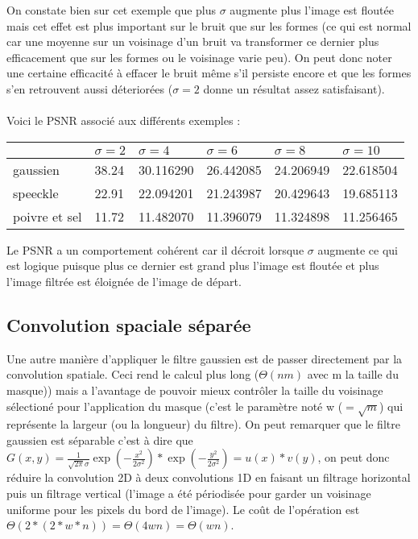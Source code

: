 \documentclass[12pt]{article}
\numberwithin{equation}{section}
\begin{document}
On constate bien sur cet exemple que plus $\sigma$ augmente plus l'image est floutée mais cet effet est plus important sur le bruit que sur les formes (ce qui est normal car une moyenne sur un voisinage d'un bruit va transformer ce dernier plus efficacement que sur les formes ou le voisinage varie peu). On peut donc noter une certaine efficacité à effacer le bruit même s'il persiste encore et que les formes s'en retrouvent aussi déteriorées ($\sigma = 2$ donne un résultat assez satisfaisant).
\\\\
Voici le PSNR associé aux différents exemples :\\
\begin{center}
  \begin{tabular}{|l|l|l|l|l|l|}
    \hline
    & $\sigma = 2$ & $\sigma = 4$ & $\sigma = 6$  & $\sigma = 8$ & $\sigma = 10$ \\
    \hline
    gaussien & 38.24 & 30.116290 & 26.442085 & 24.206949 & 22.618504\\
    \hline
    speeckle & 22.91 & 22.094201  & 21.243987 & 20.429643 & 19.685113\\
    \hline
    poivre et sel & 11.72 & 11.482070 & 11.396079 & 11.324898 & 11.256465\\
    \hline
  \end{tabular}
\end{center}
Le PSNR a un comportement cohérent car il décroit lorsque $\sigma$ augmente ce qui est logique puisque plus ce dernier est grand plus l'image est floutée et plus l'image filtrée est éloignée de l'image de départ.
\subsection{Convolution spaciale séparée}
Une autre manière d'appliquer le filtre gaussien est de passer directement par la convolution spatiale. Ceci rend le calcul plus long ($\Theta(nm)$ avec m la taille du masque)) mais a l'avantage de pouvoir mieux contrôler la taille du voisinage sélectioné pour l'application du masque (c'est le paramètre noté w ($=\sqrt{m}$) qui représente la largeur (ou la longueur) du filtre). On peut remarquer que le filtre gaussien est séparable c'est à dire que $ G(x,y) = \frac{1}{\sqrt{2\pi }\sigma}\exp({-\frac{x^2}{2\sigma^2}})*\exp({-\frac{y^2}{2\sigma^2}}) = u(x)*v(y)$, on peut donc réduire la convolution 2D à deux convolutions 1D en faisant un filtrage horizontal puis un filtrage vertical (l'image a été périodisée pour garder un voisinage uniforme pour les pixels du bord de l'image). Le coût de l'opération est $\Theta(2*(2*w*n)) = \Theta(4wn) = \Theta(wn)$. \\
\end{document}
